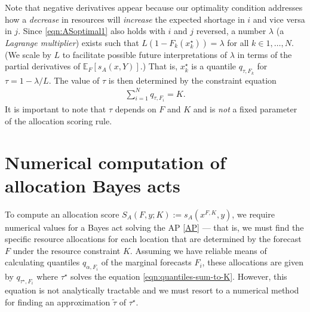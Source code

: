 \documentclass{article}
\begin{document}
Note that negative derivatives appear because our optimality condition addresses how a \emph{decrease} in resources will
\emph{increase} the expected shortage in $i$ and vice versa in $j$. Since \eqref{eqn:ASoptimal1} also holds with $i$ and $j$
reversed, a number $\lambda$ (a \emph{Lagrange multiplier}) exists such that
$L(1-F_k(x^{\star}_k)) = \lambda$ for all $k \in 1,\ldots,N$.
(We scale by $L$ to facilitate possible future interpretations of $\lambda$ in terms of the partial derivatives
of $\mathbb{E}_{F} [s_A(x, Y)]$.)
That is, $x^{\star}_k$ is a quantile $q_{\tau,F_k}$ for
$\tau = 1 - \lambda/L$. The value of $\tau$ is then determined by the constraint equation
\begin{align}
\sum_{i=1}^N q_{\tau,F_i} = K. \label{eqn:quantiles-sum-to-K}
\end{align}
It is important to note that $\tau$ depends on $F$ and $K$ and is \emph{not} a fixed parameter
of the allocation scoring rule.

\section{Numerical computation of allocation Bayes acts}
\label{sec:numeric}

To compute an allocation score $S_A(F,y;K) := s_A(x^{F,K},y)$, we require numerical values for a
Bayes act solving the AP \eqref{AP} --- that is, we must find the specific resource allocations for each location that are determined by the forecast $F$ under the resource constraint $K$.
Assuming we have reliable means of calculating quantiles $q_{\alpha,F_i}$
of the marginal forecasts $F_i$,
these allocations are given by $q_{\tau^{\star},F_i}$ where $\tau^{\star}$ solves the equation \eqref{eqn:quantiles-sum-to-K}.
However, this equation is not analytically tractable and we must resort to a numerical method
for finding an approximation $\tilde{\tau}$ of $\tau^{\star}$.
\end{document}
